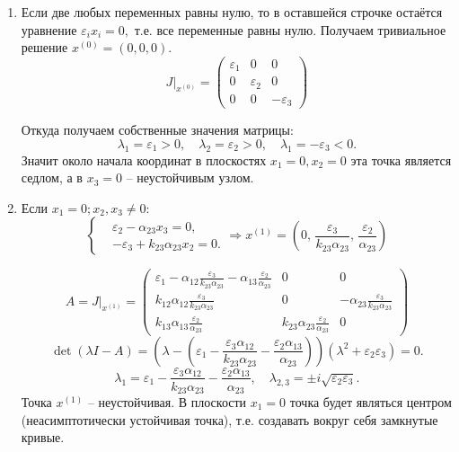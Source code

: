     \begin{enumerate}
        \item Если две любых переменных равны нулю, то в оставшейся строчке остаётся уравнение \( \varepsilon_i x_i = 0, \) т.е. все переменные равны нулю. Получаем тривиальное решение \( x^{(0)} = (0,0,0) \).
        \[
            J \big|_{x^{(0)}} = \left(\begin{matrix}
                \varepsilon_1 & 0 & 0 \\
                0 & \varepsilon_2 & 0 \\
                0 & 0  & -\varepsilon_3
            \end{matrix}\right)
        \]

        Откуда получаем собственные значения матрицы: 
        \[
            \lambda_1 = \varepsilon_1 > 0, \quad \lambda_2 = \varepsilon_2 > 0, \quad \lambda_1 = -\varepsilon_3 < 0.
        \]
        Значит около начала координат в плоскостях \( x_1 = 0, x_2 = 0 \) эта точка является седлом, а в \( x_3 = 0 \) -- неустойчивым узлом.
        \item Если \( x_1 = 0; x_2, x_3 \neq 0 \):
            \[
                \left\{\begin{split}
                    & \varepsilon_2 - \alpha_{23} x_3 = 0, \\
                    & -\varepsilon_3 + k_{23} \alpha_{23} x_2 = 0. 
                \end{split}\right.
                \Rightarrow
                x^{(1)} = \left( 0,\, \frac{\varepsilon_3}{k_{23} \alpha_{23}},\, \frac{\varepsilon_2}{\alpha_{23}} \right)
            \]

            \[
                A = J \big|_{x^{(1)}} = \left(\begin{matrix}
                    \varepsilon_1 - \alpha_{12} \frac{\varepsilon_3}{k_{23} \alpha_{23}} - \alpha_{13} \frac{\varepsilon_2}{\alpha_{23}} & 0 & 0 \\[10pt]
                    k_{12} \alpha_{12} \frac{\varepsilon_3}{k_{23} \alpha_{23}} & 0 & -\alpha_{23} \frac{\varepsilon_3}{k_{23} \alpha_{23}} \\[10pt]
                    k_{13} \alpha_{13} \frac{\varepsilon_2}{\alpha_{23}} & k_{23} \alpha_{23} \frac{\varepsilon_2}{\alpha_{23}}  & 0
                \end{matrix}\right)
            \]
            \[
                \det(\lambda I - A) = \left(\lambda - \left(\varepsilon_1 - \frac{\varepsilon_3 \alpha_{12} }{k_{23} \alpha_{23}} - \frac{\varepsilon_2 \alpha_{13}}{\alpha_{23}} \right) \right)(\lambda^2 + \varepsilon_2 \varepsilon_3) = 0.
            \]
            \[
                \lambda_1 = \varepsilon_1 - \frac{\varepsilon_3 \alpha_{12} }{k_{23} \alpha_{23}} - \frac{\varepsilon_2 \alpha_{13}}{\alpha_{23}} , \quad \lambda_{2,3} = \pm i \sqrt{\varepsilon_2 \varepsilon_3}.
            \]
            Точка \( x^{(1)} \) -- неустойчивая. В плоскости \( x_1 = 0 \) точка будет являться центром (неасимптотически устойчивая точка), т.е. создавать вокруг себя замкнутые кривые.


\end{enumerate}
